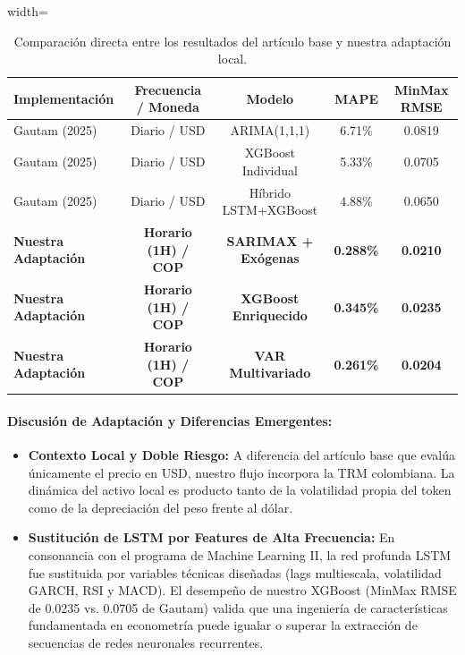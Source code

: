 \documentclass[12pt,letterpaper]{article}
\begin{document}
\begin{table}[H]
\centering
\caption{Comparación directa entre los resultados del artículo base y nuestra adaptación local.}
\label{tab:paper_contrast}
\begin{adjustbox}{width=\textwidth}
\begin{tabular}{lcccc}
\toprule
\textbf{Implementación} & \textbf{Frecuencia / Moneda} & \textbf{Modelo} & \textbf{MAPE} & \textbf{MinMax RMSE} \\
\midrule
Gautam (2025) \cite{gautam2025crypto} & Diario / USD & ARIMA(1,1,1) & 6.71\% & 0.0819 \\
Gautam (2025) \cite{gautam2025crypto} & Diario / USD & XGBoost Individual & 5.33\% & 0.0705 \\
Gautam (2025) \cite{gautam2025crypto} & Diario / USD & Híbrido LSTM+XGBoost & 4.88\% & 0.0650 \\
\midrule
\textbf{Nuestra Adaptación} & \textbf{Horario (1H) / COP} & \textbf{SARIMAX + Exógenas} & \textbf{0.288\%} & \textbf{0.0210} \\
\textbf{Nuestra Adaptación} & \textbf{Horario (1H) / COP} & \textbf{XGBoost Enriquecido} & \textbf{0.345\%} & \textbf{0.0235} \\
\textbf{Nuestra Adaptación} & \textbf{Horario (1H) / COP} & \textbf{VAR Multivariado} & \textbf{0.261\%} & \textbf{0.0204} \\
\bottomrule
\end{tabular}
\end{adjustbox}
\end{table}

\paragraph{Discusión de Adaptación y Diferencias Emergentes:}
\begin{itemize}
    \item \textbf{Contexto Local y Doble Riesgo:} A diferencia del artículo base que evalúa únicamente el precio en USD, nuestro flujo incorpora la TRM colombiana. La dinámica del activo local es producto tanto de la volatilidad propia del token como de la depreciación del peso frente al dólar.
    \item \textbf{Sustitución de LSTM por Features de Alta Frecuencia:} En consonancia con el programa de Machine Learning II, la red profunda LSTM fue sustituida por variables técnicas diseñadas (lags multiescala, volatilidad GARCH, RSI y MACD). El desempeño de nuestro XGBoost (MinMax RMSE de 0.0235 vs. 0.0705 de Gautam) valida que una ingeniería de características fundamentada en econometría puede igualar o superar la extracción de secuencias de redes neuronales recurrentes.
\end{itemize}
\end{document}
